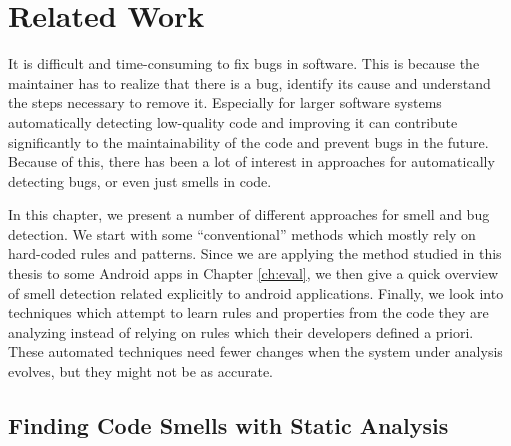\chapter{Related Work}\label{ch:relWork}



It is difficult and time-consuming to fix bugs in software.
This is because the maintainer has to realize that there is a bug, identify its cause and understand the steps necessary to remove it.
Especially for larger software systems automatically detecting low-quality code and improving it can contribute significantly to the maintainability of the code and prevent bugs in the future.
Because of this, there has been a lot of interest in approaches for automatically detecting bugs, or even just smells in code.

In this chapter, we present a number of different approaches for smell and bug detection.
We start with some ``conventional'' methods which mostly rely on hard-coded rules and patterns.
Since we are applying the method studied in this thesis to some Android apps in Chapter \ref{ch:eval}, we then give a quick overview of smell detection related explicitly to android applications.
Finally, we look into techniques which attempt to learn rules and properties from the code they are analyzing instead of relying on rules which their developers defined a priori.
These automated techniques need fewer changes when the system under analysis evolves, but they might not be as accurate.

\section{Finding Code Smells with Static Analysis}

